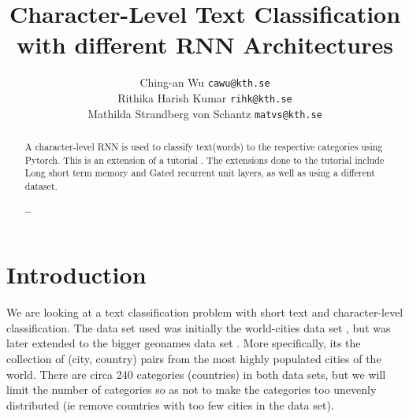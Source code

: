 \documentclass[runningheads]{llncs}
\begin{document}
\pagestyle{headings}
\mainmatter
\def\ECCV16SubNumber{***}
\title{Character-Level Text Classification with different RNN Architectures}
\author{
	Ching-an Wu {\tt cawu@kth.se} \\
    Rithika Harish Kumar {\tt rihk@kth.se} \\
	Mathilda Strandberg von Schantz {\tt matvs@kth.se} \\
}

\maketitle


\begin{abstract}

A character-level RNN is used to classify text(words) to the respective categories using Pytorch. This is an extension of a tutorial \cite{tutorial}. The extensions done to the tutorial include Long short term memory and Gated recurrent unit layers, as well as using a different dataset.   

\dots
{}

\end{abstract}


\section{Introduction}


We are looking at a text classification problem with short text and character-level classification. The data set used was initially the world-cities data set \cite{world-cities}, but was later extended to the bigger geonames data set \cite{geonames}. More specifically, its the collection of (city, country) pairs from the most highly populated cities of the world. There are circa 240 categories (countries) in both data sets, but we will limit the number of categories so as not to make the categories too unevenly distributed (ie remove countries with too few cities in the data set).
\end{document}
